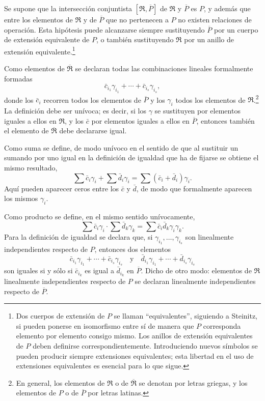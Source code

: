 \documentclass[11pt]{article}
\begin{document}
Se supone que la intersección conjuntista $[\mathfrak R,\overline P]$ de $\mathfrak R$ y $\overline P$ es $P$, y además que entre los elementos de $\mathfrak R$ y de $\overline P$ que no pertenecen a $P$ no existen relaciones de operación. Esta hipótesis puede alcanzarse siempre sustituyendo $\overline P$ por un cuerpo de extensión equivalente de $P$, o también sustituyendo $\mathfrak R$ por un anillo de extensión equivalente.\footnote{Dos cuerpos de extensión de $P$ se llaman ``equivalentes'', siguiendo a Steinitz, si pueden ponerse en isomorfismo entre sí de manera que $P$ corresponda elemento por elemento consigo mismo. Los anillos de extensión equivalentes de $P$ deben definirse correspondientemente. Introduciendo nuevos símbolos se pueden producir siempre extensiones equivalentes; esta libertad en el uso de extensiones equivalentes es esencial para lo que sigue.}

Como elementos de $\overline{\mathfrak R}$ se declaran todas las combinaciones lineales formalmente formadas
\[
   \bar c_{i_1}\gamma_{i_1}+\cdots+\bar c_{i_s}\gamma_{i_s},
\]
donde los $\bar c_i$ recorren todos los elementos de $\overline P$ y los $\gamma_i$ todos los elementos de $\mathfrak R$.\footnote{En general, los elementos de $\mathfrak R$ o de $\overline{\mathfrak R}$ se denotan por letras griegas, y los elementos de $P$ o de $\overline P$ por letras latinas.} La definición debe ser unívoca; es decir, si los $\gamma$ se sustituyen por elementos iguales a ellos en $\mathfrak R$, y los $\bar c$ por elementos iguales a ellos en $\overline P$, entonces también el elemento de $\overline{\mathfrak R}$ debe declararse igual.

Como suma se define, de modo unívoco en el sentido de que al sustituir un sumando por uno igual en la definición de igualdad que ha de fijarse se obtiene el mismo resultado,
\[
  \sum \bar c_i\gamma_i+\sum \bar d_i\gamma_i
  =\sum(\bar c_i+\bar d_i)\gamma_i .
\]
Aquí pueden aparecer ceros entre los $\bar c$ y $\bar d$, de modo que formalmente aparecen los mismos $\gamma_i$.

Como producto se define, en el mismo sentido unívocamente,
\[
  \sum \bar c_i\gamma_i\cdot \sum \bar d_k\gamma_k
  =\sum \bar c_i\bar d_k\gamma_i\gamma_k .
\]
Para la definición de igualdad se declara que, si $\gamma_{i_1},\ldots,\gamma_{i_s}$ son linealmente independientes respecto de $P$, entonces dos elementos
\[
   \bar c_{i_1}\gamma_{i_1}+\cdots+\bar c_{i_s}\gamma_{i_s}
   \quad\text{y}\quad
   \bar d_{i_1}\gamma_{i_1}+\cdots+\bar d_{i_s}\gamma_{i_s}
\]
son iguales si y sólo si $\bar c_{i_k}$ es igual a $\bar d_{i_k}$ en $\overline P$. Dicho de otro modo: elementos de $\mathfrak R$ linealmente independientes respecto de $P$ se declaran linealmente independientes respecto de $\overline P$.
\end{document}

